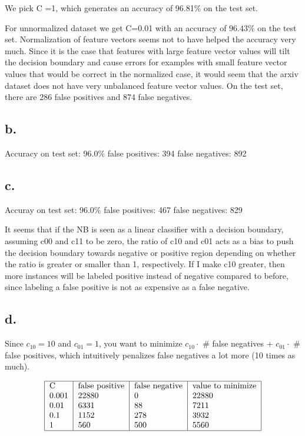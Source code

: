 \documentclass[]{article}
\begin{document}
We pick C =1, which generates an accuracy of 96.81$\%$ on the test set.

For unnormalized dataset we get C=0.01 with an accuracy of $96.43\%$ on the test set. Normalization of feature vectors seems not to have helped the accuracy very much. Since it is the case that features with large feature vector values will tilt the decision boundary and cause errors for examples with small feature vector values that would be correct in the normalized case, it would seem that the arxiv dataset does not have very unbalanced feature vector values. On the test set, there are 286 false positives and 874 false negatives. 


\subsection*{b.}
Accuracy on test set: 96.0$\%$
false positives: 394
false negatives: 892

\subsection*{c.}
Accuray on test set: 96.0$\%$
false positives: 467
false negatives: 829

It seems that if the NB is seen as a linear classifier with a decision boundary, assuming c00 and c11 to be zero, the ratio of c10 and c01 acts as a bias to push the decision boundary towards negative or positive region depending on whether the ratio is greater or smaller than 1, respectively. If I make c10 greater, then more instances will be labeled positive instead of negative compared to before, since labeling a false positive is not as expensive as a false negative. 

\subsection*{d.}
Since $c_{10} = 10$ and $c_{01} = 1$, you want to minimize $c_{10} \cdot$ \# false negatives + $c_{01} \cdot$ \# false positives, which intuitively penalizes false negatives a lot more (10 times as much).

\begin{align*}
 \begin{tabular}{|l|l|l|l|}
  \hline
  C & false positive & false negative & value to minimize\\
  0.001 & 22880 & 0 & 22880 \\
  0.01 & 6331 & 88 & 7211 \\
  0.1 & 1152 & 278 & 3932 \\
  1 & 560 & 500 & 5560 \\
  \hline
  \end{tabular}
\end{align*}
\end{document}
